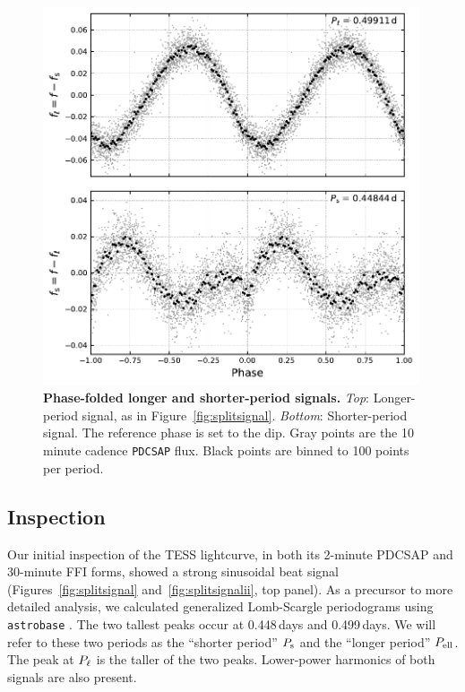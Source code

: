 \documentclass[12pt,twocolumn,tighten]{aastex62}
\begin{document}
\begin{figure}[t]
	\begin{center}
		\leavevmode
		\includegraphics[width=0.99\textwidth]{f3.pdf}
	\end{center}
	\vspace{-0.7cm}
	\caption{ {\bf Phase-folded longer and shorter-period signals.}
    {\it Top}: Longer-period signal, as in Figure~\ref{fig:splitsignal}.
    {\it Bottom}: Shorter-period signal. The reference phase is set to
    the dip.  Gray points are the 10 minute cadence
    \texttt{PDCSAP} flux.  Black points are binned to 100 points per
    period.
		\label{fig:phasefold}
	}
\end{figure}

\subsection{Inspection}

Our initial inspection of the TESS lightcurve, in both its 2-minute
PDCSAP and 30-minute FFI forms, showed a strong sinusoidal beat signal
(Figures~\ref{fig:splitsignal} and~\ref{fig:splitsignalii}, top
panel). As a precursor to more detailed analysis, we calculated generalized
Lomb-Scargle periodograms using \texttt{astrobase}
\citep{lomb_1976,scargle_studies_1982,vanderplas_periodograms_2015,bhatti_astrobase_2018}.
The two tallest peaks occur at 0.448\,days and 0.499\,days.
We will refer to these two periods as the ``shorter period'' $P_{\rm s}$
and the ``longer period'' $P_{\rm ell}$.
The peak at $P_{\rm \ell}$ is the taller of the two peaks.
Lower-power harmonics of both signals are also present.
\end{document}
